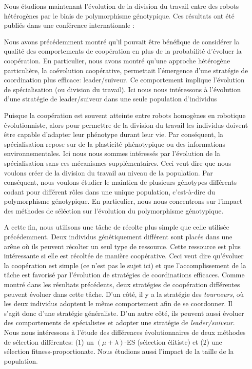 			Nous étudions maintenant l'évolution de la division du travail entre des robots hétérogènes par le biais de polymorphisme génotypique. Ces résultats ont été publiés dans une conférence internationale :

			\begin{quote}
			\end{quote}

			Nous avons précédemment montré qu'il pouvait être bénéfique de considérer la qualité des comportements de coopération en plus de la probabilité d'évoluer la coopération. En particulier, nous avons montré qu'une approche hétérogène particulière, la coévolution coopérative, permettait l'émergence d'une stratégie de coordination plus efficace: leader/suiveur. Ce comportement implique l'évolution de spécialisation (ou division du travail). Ici nous nous intéressons à l'évolution d'une stratégie de leader/suiveur dans une seule population d'individus

			Puisque la coopération est souvent atteinte entre robots homogènes en robotique évolutionniste, alors pour permettre de la division du travail les individus doivent être capable d'adapter leur phénotype durant leur vie. Par conséquent, la spécialisation repose sur de la plasticité phénotypique ou des informations environnementales. Ici nous nous sommes intéressés par l'évolution de la spécialisation sans ces mécanismes supplémentaires. Ceci veut dire que nous voulons créer de la division du travail au niveau de la population. Par conséquent, nous voulons étudier le maintien de plusieurs génotypes différents codant pour différent rôles dans une unique population, c'est-à-dire du polymorphisme génotypique. En particulier, nous nous concentrons sur l'impact des méthodes de séléction sur l'évolution du polymorphisme génotypique.

			A cette fin, nous utilisons une tâche de récolte plus simple que celle utilisée précédemment. Deux individus génétiquement différent sont placés dans une arêne où ils peuvent récolter un seul type de ressource. Cette ressource est plus intéressante si elle est récoltée de manière coopérative. Ceci veut dire qu'évoluer la coopération est simple (ce n'est pas le sujet ici) et que l'accomplissement de la tâche est favorisé par l'évolution de stratégies de coordinations efficaces. Comme montré dans les résultats précédents, deux stratégies de coopération différentes peuvent évoluer dans cette tâche. D'un côté, il y a la stratégie des \emph{tourneurs}, où les deux individus adoptent le même comportement afin de se coordonner. Il s'agit donc d'une stratégie généraliste. D'un autre côté, ils peuvent aussi évoluer des comportements de spécialistes et adopter une stratégie de \emph{leader/suiveur}. Nous nous intéressons à l'étude des différences évolutionnaires de deux méthodes de sélection différentes: (1) un \((\mu + \lambda)\)-ES (sélection élitiste) et (2) une sélection fitness-proportionate. Nous étudions aussi l'impact de la taille de la population.

